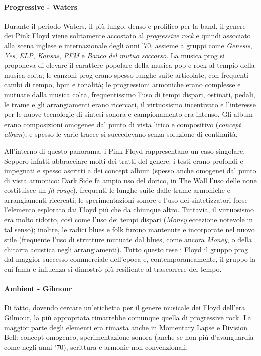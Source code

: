 \documentclass[class=book, crop=false, oneside, 12pt]{standalone}
\begin{document}
    \paragraph{Progressive - Waters}
    Durante il periodo Waters, il più lungo, denso e prolifico per la band, il genere dei Pink Floyd viene solitamente accostato al \emph{progressive rock} e quindi associato alla scena inglese e internazionale degli anni '70, assieme a gruppi come \emph{Genesis}, \emph{Yes}, \emph{ELP}, \emph{Kansas}, \emph{PFM} e \emph{Banco del mutuo soccorso}. La musica prog si proponeva di elevare il carattere popolare della musica pop e rock al tempio della musica colta; le canzoni prog erano spesso lunghe suite articolate, con frequenti cambi di tempo, bpm e tonalità; le progressioni armoniche erano complesse e mutuate dalla musica colta, frequentissimo l'uso di tempi dispari, ostinati, pedali, le trame e gli arrangiamenti erano ricercati, il virtuosismo incentivato e l'interesse per le nuove tecnologie di sintesi sonora e campionamento era intenso. Gli album erano composizioni omogenee dal punto di vista lirico e compositivo (\emph{concept album}), e spesso le varie tracce si succedevano senza soluzione di continuità.

    All'interno di questo panorama, i Pink Floyd rappresentano un caso singolare. Seppero infatti abbracciare molti dei tratti del genere: i testi erano profondi e impegnati e spesso ascritti a dei concept album (spesso anche omogenei dal punto di vista armonico: Dark Side fa ampio uso del dorico, in The Wall l'uso delle none costituisce un \emph{fil rouge}), frequenti le lunghe suite dalle trame armoniche e arrangiamenti ricercati; le sperimentazioni sonore e l'uso dei sintetizzatori forse l'elemento esplorato dai Floyd più che da chiunque altro. Tuttavia, il virtuosismo era molto ridotto, così come l'uso dei tempi dispari (\emph{Money} eccezione notevole in tal senso); inoltre, le radici blues e folk furono mantenute e incorporate nel nuovo stile (frequente l'uso di strutture mutuate dal blues, come ancora \emph{Money}, o della chitarra acustica negli arrangiamenti). Tutto questo rese i Floyd il gruppo prog dal maggior successo commerciale dell'epoca e, contemporaneamente, il gruppo la cui fama e influenza si dimostrò più resiliente al trascorrere del tempo.

    \paragraph{Ambient - Gilmour}
    Di fatto, dovendo cercare un'etichetta per il genere musicale dei Floyd dell'era Gilmour, la più appropriata rimarrebbe comunque quella di progressive rock. La maggior parte degli elementi era rimasta anche in Momentary Lapse e Division Bell: concept omogeneo, sperimentazione sonora (anche se non più d'avanguardia come negli anni '70), scrittura e armonie non convenzionali. 
\end{document}
